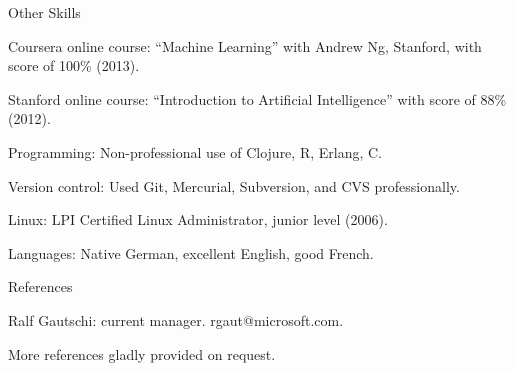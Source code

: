 \begin{cv}{}
  \begin{cvlist}{Other Skills}
  \item[Coursera online course:] \vspace{-1.2mm}``Machine Learning''
    with Andrew Ng, Stanford, with score of 100\% (2013).
  \item[Stanford online course:] \vspace{-1.2mm}``Introduction to Artificial
    Intelligence'' with score of 88\% (2012).
  \item[Programming:] \vspace{-1.2mm}Non-professional use of Clojure, R,
    Erlang, C.
  \item[Version control:] \vspace{-1.2mm}Used Git, Mercurial, Subversion, and CVS
    professionally.
  \item[Linux:] \vspace{-1.2mm}LPI Certified Linux Administrator,
    junior level (2006).
  \item[Languages:] \vspace{-1.2mm}Native German, excellent English, good
    French.
  \end{cvlist}


  \begin{cvlist}{References}
  \item[] \hspace{-3.5mm}Ralf Gautschi: current manager. rgaut@microsoft.com.
  \item[] \hspace{-3.5mm}More references gladly provided on request.

  \end{cvlist}


\end{cv}

